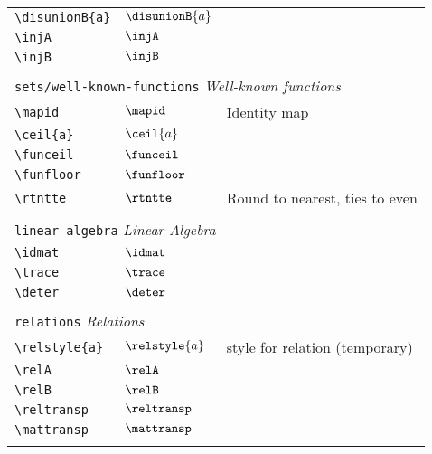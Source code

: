\begin{longtable}{lll}
 {\color[rgb]{0.5,0.5,0.5}\texttt{\textbackslash disunionB\{a\}}} & $\disunionB{a}$ & \\ 
 {\color[rgb]{0.5,0.5,0.5}\texttt{\textbackslash injA}} & $\injA$ & \\ 
 {\color[rgb]{0.5,0.5,0.5}\texttt{\textbackslash injB}} & $\injB$ & \\ 
  &  & \\ 
 \multicolumn{3}{l}{{\color[rgb]{0.5,0.5,0.5}\texttt{sets/well-known-functions}} \emph{Well-known functions}}\\ 
 \hline
{\color[rgb]{0.5,0.5,0.5}\texttt{\textbackslash mapid}} & $\mapid$ &  Identity map\\ 
 {\color[rgb]{0.5,0.5,0.5}\texttt{\textbackslash ceil\{a\}}} & $\ceil{a}$ & \\ 
 {\color[rgb]{0.5,0.5,0.5}\texttt{\textbackslash funceil}} & $\funceil$ & \\ 
 {\color[rgb]{0.5,0.5,0.5}\texttt{\textbackslash funfloor}} & $\funfloor$ & \\ 
 {\color[rgb]{0.5,0.5,0.5}\texttt{\textbackslash rtntte}} & $\rtntte$ &  Round to nearest, ties to even\\ 
  &  & \\ 
 \multicolumn{3}{l}{{\color[rgb]{0.5,0.5,0.5}\texttt{linear algebra}} \emph{Linear Algebra}}\\ 
 \hline
\hline
{\color[rgb]{0.5,0.5,0.5}\texttt{\textbackslash idmat}} & $\idmat$ & \\ 
 {\color[rgb]{0.5,0.5,0.5}\texttt{\textbackslash trace}} & $\trace$ & \\ 
 {\color[rgb]{0.5,0.5,0.5}\texttt{\textbackslash deter}} & $\deter$ & \\ 
  &  & \\ 
 \multicolumn{3}{l}{{\color[rgb]{0.5,0.5,0.5}\texttt{relations}} \emph{Relations}}\\ 
 \hline
\hline
{\color[rgb]{0.5,0.5,0.5}\texttt{\textbackslash relstyle\{a\}}} & $\relstyle{a}$ &  style for relation (temporary)\\ 
 {\color[rgb]{0.5,0.5,0.5}\texttt{\textbackslash relA}} & $\relA$ & \\ 
 {\color[rgb]{0.5,0.5,0.5}\texttt{\textbackslash relB}} & $\relB$ & \\ 
 {\color[rgb]{0.5,0.5,0.5}\texttt{\textbackslash reltransp}} & $\reltransp$ & \\ 
 {\color[rgb]{0.5,0.5,0.5}\texttt{\textbackslash mattransp}} & $\mattransp$ & \\ 
  &  & \\ 

\end{longtable}
